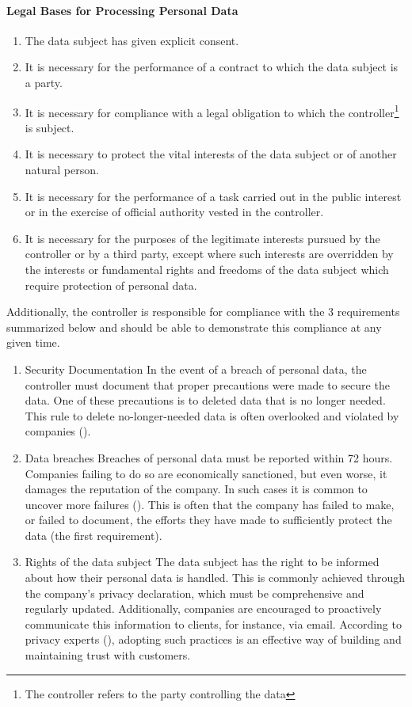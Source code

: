 \paragraph{Legal Bases for Processing Personal Data}
\label{sec:legal-bases-processing-personal-data}
\begin{enumerate}
    \item The data subject has given explicit consent.
    \item It is necessary for the performance of a contract to which the data subject is a party.
    \item It is necessary for compliance with a legal obligation to which the controller\footnote{The controller refers to the party controlling the data} is subject.
    \item It is necessary to protect the vital interests of the data subject or of another natural person.
    \item It is necessary for the performance of a task carried out in the public interest or in the exercise of official authority vested in the controller.
    \item It is necessary for the purposes of the legitimate interests pursued by the controller or by a third party, except where such interests are overridden by the interests or fundamental rights and freedoms of the data subject which require protection of personal data.
\end{enumerate}

Additionally, the controller is responsible for compliance with the 3 requirements summarized below and should be able to demonstrate this compliance at any given time.

\begin{enumerate}
    \item{Security Documentation}
    In the event of a breach of personal data, the controller must document that proper precautions were made to secure the data. One of these precautions is to deleted data that is no longer needed. This rule to delete no-longer-needed data is often overlooked and violated by companies (\cite{sa2022webinar_gdpr}).
    \item{Data breaches}
    Breaches of personal data must be reported within 72 hours. Companies failing to do so are economically sanctioned, but even worse, it damages the reputation of the company. In such cases it is common to uncover more failures (\cite{sa2022webinar_gdpr}). This is often that the company has failed to make, or failed to document, the efforts they have made to sufficiently protect the data (the first requirement).
    \item{Rights of the data subject}
    The data subject has the right to be informed about how their personal data is handled. This is commonly achieved through the company's privacy declaration, which must be comprehensive and regularly updated. Additionally, companies are encouraged to proactively communicate this information to clients, for instance, via email. According to privacy experts (\cite{sa2022webinar_gdpr}), adopting such practices is an effective way of building and maintaining trust with customers.
\end{enumerate}
    
